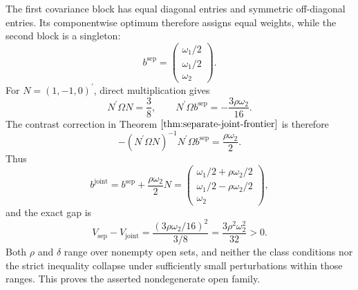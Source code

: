 The first covariance block has equal diagonal entries and symmetric off-diagonal entries. Its componentwise optimum therefore assigns equal weights, while the second block is a singleton:
\[
b^{\mathrm{sep}}=
\begin{pmatrix}\omega_1/2\\ \omega_1/2\\ \omega_2\end{pmatrix}.
\]
For \(N=(1,-1,0)^{\prime}\), direct multiplication gives
\[
N^{\prime}\Omega N=\frac38,
\qquad
N^{\prime}\Omega b^{\mathrm{sep}}=-\frac{3\rho\omega_2}{16}.
\]
The contrast correction in Theorem \(\ref{thm:separate-joint-frontier}\) is therefore
\[
-(N^{\prime}\Omega N)^{-1}N^{\prime}\Omega b^{\mathrm{sep}}
=\frac{\rho\omega_2}{2}.
\]
Thus
\[
b^{\mathrm{joint}}
=b^{\mathrm{sep}}+\frac{\rho\omega_2}{2}N
=
\begin{pmatrix}
\omega_1/2+\rho\omega_2/2\\
\omega_1/2-\rho\omega_2/2\\
\omega_2
\end{pmatrix},
\]
and the exact gap is
\[
V_{\mathrm{sep}}-V_{\mathrm{joint}}
=\frac{(3\rho\omega_2/16)^2}{3/8}
=\frac{3\rho^2\omega_2^2}{32}>0.
\]
Both \(\rho\) and \(\delta\) range over nonempty open sets, and neither the class conditions nor the strict inequality collapse under sufficiently small perturbations within those ranges. This proves the asserted nondegenerate open family.